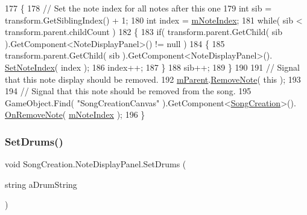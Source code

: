 \begin{DoxyCode}
177         \{
178             \textcolor{comment}{// Set the note index for all notes after this one}
179             \textcolor{keywordtype}{int} sib = transform.GetSiblingIndex() + 1;
180             \textcolor{keywordtype}{int} index = \hyperlink{class_song_creation_1_1_note_display_panel_a383f4e592812c12028e0ff3f7aec0980}{mNoteIndex};
181             \textcolor{keywordflow}{while}( sib < transform.parent.childCount )
182             \{
183                 \textcolor{keywordflow}{if}( transform.parent.GetChild( sib ).GetComponent<NoteDisplayPanel>() != null )
184                 \{
185                     transform.parent.GetChild( sib ).GetComponent<NoteDisplayPanel>().
      \hyperlink{class_song_creation_1_1_note_display_panel_a7247d36ccbd7449be872432bf1ad7781}{SetNoteIndex}( index );
186                     index++;
187                 \}
188                 sib++;
189             \}
190 
191             \textcolor{comment}{// Signal that this note display should be removed.}
192             \hyperlink{class_song_creation_1_1_note_display_panel_aa0d0186ce889ffd63cfe7587f48463c9}{mParent}.\hyperlink{class_song_creation_1_1_measure_display_panel_a56881a6bd83cad971a42aa9f9955a0ee}{RemoveNote}( \textcolor{keyword}{this} );
193 
194             \textcolor{comment}{// Signal that this note should be removed from the song.}
195             GameObject.Find( \textcolor{stringliteral}{"SongCreationCanvas"} ).GetComponent<\hyperlink{class_song_creation}{SongCreation}>().
      \hyperlink{class_song_creation_a485d615c895cddde720b719b64ab4245}{OnRemoveNote}( \hyperlink{class_song_creation_1_1_note_display_panel_a383f4e592812c12028e0ff3f7aec0980}{mNoteIndex} );
196         \}
\end{DoxyCode}
\mbox{\label{class_song_creation_1_1_note_display_panel_a1ab979ae56d06b4680b9d37ed09d40c1}} 
\subsubsection{\texorpdfstring{Set\+Drums()}{SetDrums()}}
{\footnotesize\ttfamily void Song\+Creation.\+Note\+Display\+Panel.\+Set\+Drums (\begin{DoxyParamCaption}\item[{string}]{a\+Drum\+String }\end{DoxyParamCaption})}




